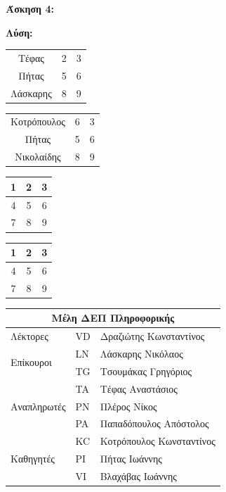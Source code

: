 \documentclass{article}
\begin{document}
\newpage

\textbf{\large{Άσκηση 4:}}\\
\par
\textbf{\large{Λύση: }}

\begin{center}
\begin{tabular}{ c c c }
  Τέφας & 2 & 3\\ 
  Πήτας & 5 & 6\\
  Λάσκαρης & 8 & 9
\end{tabular}
\end{center}
\vspace{2mm}
\begin{center}
\begin{tabular}{| c | c | c |}
  Κοτρόπουλος & 6 & 3\\
  Πήτας & 5 & 6\\
  Νικολαίδης & 8 & 9\\
\end{tabular}
\end{center}
\vspace{2mm}
\begin{center}
\begin{tabular}{| c | c | c |}
    \hline
        1 & 2 & 3 \\ \hline
        4 & 5 & 6 \\ \hline
        7 & 8 & 9 \\
    \hline
\end{tabular}
\end{center}
\vspace{2mm}
\begin{center}
\begin{tabular}{| c | c | c |}
    \hline
        1 & 2 & 3 \\ \hline
        4 & 5 & 6 \\ \hline
        7 & 8 & 9 \\
    \hline
\end{tabular}
\end{center}

\vspace{2mm}
\begin{center}
\begin{tabular}{|l|l|l|}
\hline
\multicolumn{3}{|c|}{Μέλη ΔΕΠ Πληροφορικής}\\
\hline
    Λέκτορες & VD & Δραζιώτης Κωνσταντίνος\\ 
\hline
\multirow{2}{*}{Επίκουροι}
    & LN & Λάσκαρης Νικόλαος\\
    & TG & Τσουμάκας Γρηγόριος\\
\hline
\multirow{3}{*}{Αναπληρωτές}
    & TA &Τέφας Αναστάσιος\\
    & PN  &Πλέρος Νίκος\\
    & PA &Παπαδόπουλος Απόστολος\\
\hline
\multirow{3}{*}{Καθηγητές}
    & KC & Κοτρόπουλος Κωνσταντίνος\\
    & PI & Πήτας Ιωάννης\\
    & VI & Βλαχάβας Ιωάννης\\
\hline
\end{tabular}
\end{center}
\newpage 
\end{document}
